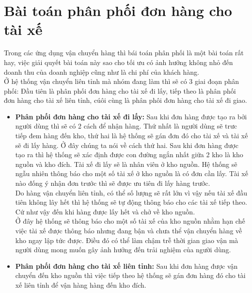 		\section{Bài toán phân phối đơn hàng cho tài xế }
		    Trong các ứng dụng vận chuyển hàng thì bái toán phân phối là một bài toán rất hay, việc giải quyết bài toán này sao cho tối ưu có ảnh hưởng không nhỏ đến doanh thu của doanh nghiệp cũng như là chi phí của khách hàng.\\
		    
		    Ở hệ thống vận chuyển liên tỉnh mà nhóm đang làm thì sẽ có 3 giai đoạn phân phối: Đầu tiên là phân phối đơn hàng cho tài xế đi lấy, tiếp theo là phân phối đơn hàng cho tài xế liên tỉnh, cúôi cùng là phân phôi đơn hàng cho tài xế đi giao.
		    
		     \begin{itemize}
                \item \textbf{Phân phối đơn hàng cho tài xế đi lấy:} Sau khi đơn hàng được tạo ra bởi người dùng thì sẽ có 2 cách để nhận hàng. Thứ nhất là người dùng sẽ trưc tiếp đem hàng đến kho, thứ hai là hệ thống sẽ gán đơn đó cho tài xế và tài xế sẽ đi lấy hàng. Ở đây chúng ta nói về cách thứ hai. Sau khi đơn hàng được tạo ra thì hệ thống sẽ xác định được con đường ngắn nhất giữa 2 kho là kho nguồn và kho đích. Tài xế đi lấy sẽ là nhân viên ở kho nguồn. Hệ thống sẽ ngẫu nhiên thông báo cho một số tài xế ở kho nguồn là có đơn cần lấy. Tài xế nào đống ý nhận đơn trước thì sẽ được ưu tiên đi lấy hàng trước.\\
                
                Do hàng vận chuyển liên tỉnh, có thể số lượng sẽ rất lớn vì vậy nếu tài xế đầu tiên không lây hết thì hệ thống sẽ tự động thông báo cho các tài xế tiếp theo. Cứ như vậy đến khi hàng được lấy hết và chở về kho nguồn.\\
                
                Ở đây hệ thống sẽ thông báo cho một số tài xế của kho nguồn nhằm hạn chế việc tài xế được thông báo nhưng đang bận và chưa thể vận chuyển hàng về kho ngay lập tức được. Điều đó có thể làm chậm trễ thời gian giao vận mà người dùng mong muốn gây ảnh hưởng đến trải nghiệm của người dùng.
            
                \item \textbf{Phân phối đơn hàng cho tài xế  liên tỉnh:} Sau khi đơn hàng được vận chuyển đến kho nguồn thì việc tiếp theo hệ thống sẽ gán đơn hàng đó cho tài xế liên tỉnh để vận hàng hàng đến kho đích.\\
                

\end{itemize}
